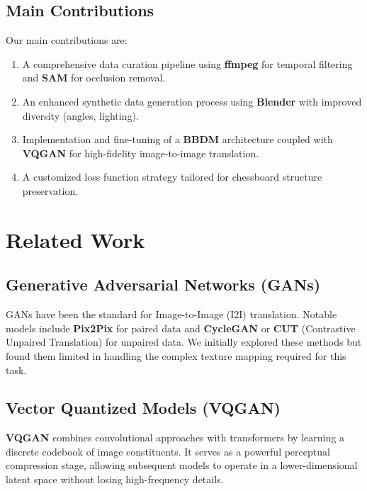 \documentclass[12pt,a4paper]{article}
\begin{document}
\subsection{Main Contributions}
Our main contributions are:
\begin{enumerate}
    \item A comprehensive data curation pipeline using \textbf{ffmpeg} for temporal filtering and \textbf{SAM} \cite{sam2023} for occlusion removal.
    \item An enhanced synthetic data generation process using \textbf{Blender} with improved diversity (angles, lighting).
    \item Implementation and fine-tuning of a \textbf{BBDM} \cite{bbdm2023} architecture coupled with \textbf{VQGAN} \cite{vqgan2021} for high-fidelity image-to-image translation.
    \item A customized loss function strategy tailored for chessboard structure preservation.
\end{enumerate}

\section{Related Work}
\label{sec:related}

\subsection{Generative Adversarial Networks (GANs)}
GANs have been the standard for Image-to-Image (I2I) translation. Notable models include \textbf{Pix2Pix} for paired data and \textbf{CycleGAN} \cite{cyclegan2017} or \textbf{CUT} (Contrastive Unpaired Translation) \cite{cut2020} for unpaired data. We initially explored these methods but found them limited in handling the complex texture mapping required for this task.

\subsection{Vector Quantized Models (VQGAN)}
\textbf{VQGAN} \cite{vqgan2021} combines convolutional approaches with transformers by learning a discrete codebook of image constituents. It serves as a powerful perceptual compression stage, allowing subsequent models to operate in a lower-dimensional latent space without losing high-frequency details.
\end{document}
